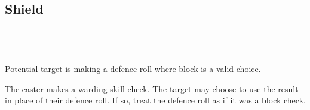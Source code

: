 \subsection*{Shield}
 \\
 \\
 \\
{Potential target is making a defence roll where block is a valid
choice.} \\

The caster makes a warding skill check. The target may choose to use the result
in place of their defence roll. If so, treat the defence roll as if it was a
block check.
